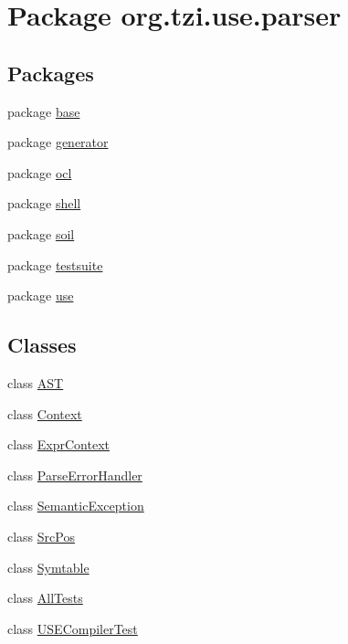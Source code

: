 \hypertarget{namespaceorg_1_1tzi_1_1use_1_1parser}{\section{Package org.\-tzi.\-use.\-parser}
\label{namespaceorg_1_1tzi_1_1use_1_1parser}
}
\subsection*{Packages}
\begin{DoxyCompactItemize}
\item 
package \hyperlink{namespaceorg_1_1tzi_1_1use_1_1parser_1_1base}{base}
\item 
package \hyperlink{namespaceorg_1_1tzi_1_1use_1_1parser_1_1generator}{generator}
\item 
package \hyperlink{namespaceorg_1_1tzi_1_1use_1_1parser_1_1ocl}{ocl}
\item 
package \hyperlink{namespaceorg_1_1tzi_1_1use_1_1parser_1_1shell}{shell}
\item 
package \hyperlink{namespaceorg_1_1tzi_1_1use_1_1parser_1_1soil}{soil}
\item 
package \hyperlink{namespaceorg_1_1tzi_1_1use_1_1parser_1_1testsuite}{testsuite}
\item 
package \hyperlink{namespaceorg_1_1tzi_1_1use_1_1parser_1_1use}{use}
\end{DoxyCompactItemize}
\subsection*{Classes}
\begin{DoxyCompactItemize}
\item 
class \hyperlink{classorg_1_1tzi_1_1use_1_1parser_1_1_a_s_t}{A\-S\-T}
\item 
class \hyperlink{classorg_1_1tzi_1_1use_1_1parser_1_1_context}{Context}
\item 
class \hyperlink{classorg_1_1tzi_1_1use_1_1parser_1_1_expr_context}{Expr\-Context}
\item 
class \hyperlink{classorg_1_1tzi_1_1use_1_1parser_1_1_parse_error_handler}{Parse\-Error\-Handler}
\item 
class \hyperlink{classorg_1_1tzi_1_1use_1_1parser_1_1_semantic_exception}{Semantic\-Exception}
\item 
class \hyperlink{classorg_1_1tzi_1_1use_1_1parser_1_1_src_pos}{Src\-Pos}
\item 
class \hyperlink{classorg_1_1tzi_1_1use_1_1parser_1_1_symtable}{Symtable}
\item 
class \hyperlink{classorg_1_1tzi_1_1use_1_1parser_1_1_all_tests}{All\-Tests}
\item 
class \hyperlink{classorg_1_1tzi_1_1use_1_1parser_1_1_u_s_e_compiler_test}{U\-S\-E\-Compiler\-Test}
\end{DoxyCompactItemize}
